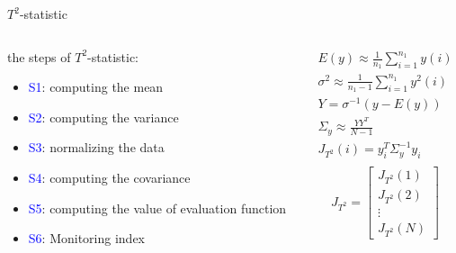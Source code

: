 \documentclass[10pt]{beamer}
\begin{document}
\begin{frame}{$T^2$-statistic}
    \begin{columns}
        \begin{column}{0.5\textwidth}
            the steps of $T^2$-statistic:
      \begin{itemize}
      \item \textcolor{blue}{S1}: computing the mean
      \item \textcolor{blue}{S2}: computing the variance
      \item \textcolor{blue}{S3}: normalizing the data
      \item \textcolor{blue}{S4}: computing the  covariance
      \item \textcolor{blue}{S5}: computing the value of evaluation function
      \item \textcolor{blue}{S6}: Monitoring index
 	 \end{itemize}  
        \end{column}
        \begin{column}{0.5\textwidth}  %
      \begin{equation} \nonumber
               \begin{aligned}
                    E(y) \approx \frac{1}{n_1}\sum_{i=1}^{n_1}y(i)   \\
                   \sigma^2 \approx \frac{1}{n_1-1}\sum_{i=1}^{n_1}y^2(i) \\
                    Y = \sigma^{-1}(y-E(y)) \\
                   \Sigma_y \approx \frac{YY^T}{N-1} \\
                   J_{T^2}(i) = y_i^T\Sigma_y^{-1}y_i \\
             \end{aligned}
     \end{equation}
      \begin{equation} 
                  J_{T^2} =  \begin{bmatrix}
                          J_{T^2}(1) \\
                          J_{T^2}(2) \\
                          \vdots      \\
                           J_{T^2}(N)
                         \end{bmatrix}
                         \label{Jt}
                \end{equation}
        \end{column}
    \end{columns}
\end{frame}
\end{document}
